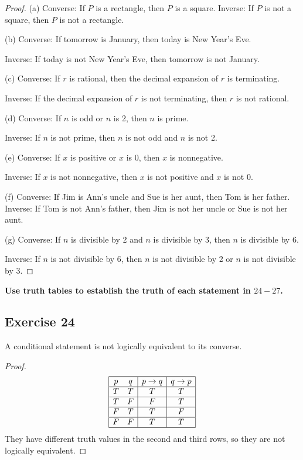 \documentclass[14pt]{extarticle}
\begin{document}
\begin{proof} (a) Converse: If $P$ is a rectangle, then $P$ is a square.
Inverse: If $P$ is not a square, then $P$ is not a rectangle.

(b) Converse: If tomorrow is January, then today is New Year’s Eve.

Inverse: If today is not New Year’s Eve, then tomorrow is not January.

(c) Converse: If $r$ is rational, then the decimal expansion of $r$ is
terminating.

Inverse: If the decimal expansion of $r$ is not terminating, then $r$ is not
rational.

(d) Converse: If $n$ is odd or $n$ is 2, then $n$ is prime.

Inverse: If $n$ is not prime, then $n$ is not odd and $n$ is not 2.	

(e) Converse: If $x$ is positive or $x$ is 0, then $x$ is nonnegative.

Inverse: If $x$ is not nonnegative, then $x$ is not positive and $x$ is not 0.

(f) Converse: If Jim is Ann’s uncle and Sue is her aunt, then Tom is her father.
Inverse: If Tom is not Ann’s father, then Jim is not her uncle or Sue is not her
aunt.

(g) Converse: If $n$ is divisible by 2 and $n$ is divisible by 3, then $n$ is
divisible by 6.

Inverse: If $n$ is not divisible by 6, then $n$ is not divisible by 2 or $n$ is
not divisible by 3. \end{proof}

{\bf Use truth tables to establish the truth of each statement in $24-27$.}
\subsection{Exercise 24} A conditional statement is not logically equivalent to
its converse.

\begin{proof} $$ \begin{array}{|cc|c|c|} \hline p & q & p \to q & q \to p \\
\hline T & T & T & T \\ \hline T & F & F & T \\ \hline F & T & T & F \\ \hline F
& F & T & T \\ \hline \end{array} $$ They have different truth values in the
second and third rows, so they are not logically equivalent. \end{proof}
\end{document}

